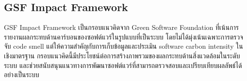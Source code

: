\subsection{GSF Impact Framework}
{\boldfont GSF Impact Framework} เป็นกรอบแนวคิดจาก {\italicfont Green Software Foundation} ที่เน้นการรายงานผลกระทบด้านคาร์บอนของซอฟต์แวร์ในรูปแบบที่เป็นระบบ โดยไม่ได้มุ่งเน้นเฉพาะการตรวจจับ {\italicfont code smell} แต่ให้ความสำคัญกับการเก็บข้อมูลและประเมิน {\italicfont software carbon intensity} ในเชิงมาตรฐาน กรอบแนวคิดนี้มีประโยชน์ต่อการสร้างภาพรวมของผลกระทบด้านสิ่งแวดล้อมในระดับระบบ และช่วยสนับสนุนแนวทางการพัฒนาซอฟต์แวร์ที่สามารถตรวจสอบและเปรียบเทียบผลลัพธ์ได้อย่างเป็นระบบ

\begin{table}[H]
    \centering
    \renewcommand{\arraystretch}{1.3}
\captionsetup{justification=centering, name=ตาราง}
\caption{ตารางสรุปการเปรียบเทียบเครื่องมือที่เกี่ยวข้องในระบบนิเวศของงานวิจัย}
\label{table:existing-tools-summary}
\end{table}

